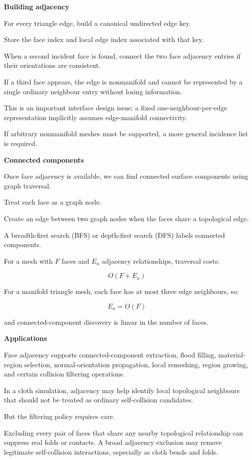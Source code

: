 \textbf{Building adjacency}

For every triangle edge, build a canonical undirected edge key.

Store the face index and local edge index associated with that key.

When a second incident face is found, connect the two face adjacency entries if their orientations are consistent.

If a third face appears, the edge is nonmanifold and cannot be represented by a single ordinary neighbour entry without losing information.

This is an important interface design issue: a fixed one-neighbour-per-edge representation implicitly assumes edge-manifold connectivity.

If arbitrary nonmanifold meshes must be supported, a more general incidence list is required.

\textbf{Connected components}

Once face adjacency is available, we can find connected surface components using graph traversal.

Treat each face as a graph node.

Create an edge between two graph nodes when the faces share a topological edge.

A breadth-first search (BFS) or depth-first search (DFS) labels connected components.

For a mesh with \(F\) faces and \(E_a\) adjacency relationships, traversal costs:

\[
\boxed{O(F+E_a)}
\]

For a manifold triangle mesh, each face has at most three edge neighbours, so:

\[
E_a=O(F)
\]

and connected-component discovery is linear in the number of faces.

\textbf{Applications}

Face adjacency supports connected-component extraction, flood filling, material-region selection, normal-orientation propagation, local remeshing, region growing, and certain collision filtering operations.

In a cloth simulation, adjacency may help identify local topological neighbours that should not be treated as ordinary self-collision candidates.

But the filtering policy requires care.

Excluding every pair of faces that share any nearby topological relationship can suppress real folds or contacts. A broad adjacency exclusion may remove legitimate self-collision interactions, especially as cloth bends and folds.

